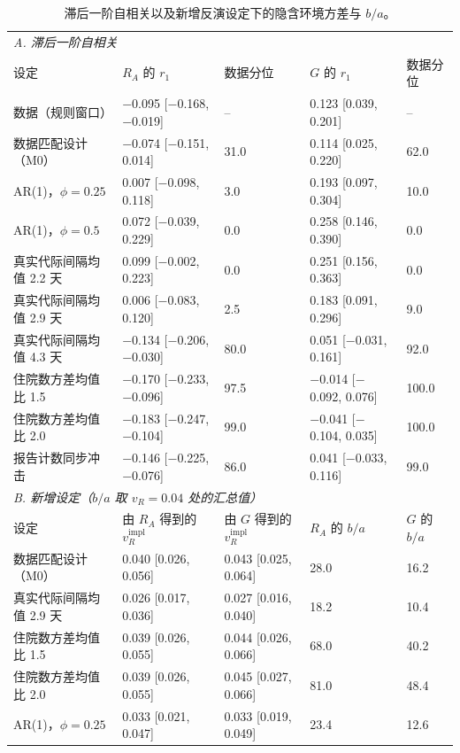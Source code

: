 \begin{table}[htbp]
\centering
\footnotesize
\setlength{\tabcolsep}{4pt}
\caption{滞后一阶自相关以及新增反演设定下的隐含环境方差与 $b/a$。}
\label{tab:s10}
\begin{tabular}{lllll}
\toprule
\multicolumn{5}{l}{\textit{A. 滞后一阶自相关}}\\
设定 & $R_A$ 的 $r_1$ & 数据分位 & $G$ 的 $r_1$ & 数据分位 \\
\midrule
数据（规则窗口） & $-$0.095 [$-$0.168, $-$0.019] & -- & 0.123 [0.039, 0.201] & -- \\
数据匹配设计（M0） & $-$0.074 [$-$0.151, 0.014] & 31.0 & 0.114 [0.025, 0.220] & 62.0 \\
AR(1)，$\phi=0.25$ & 0.007 [$-$0.098, 0.118] & 3.0 & 0.193 [0.097, 0.304] & 10.0 \\
AR(1)，$\phi=0.5$ & 0.072 [$-$0.039, 0.229] & 0.0 & 0.258 [0.146, 0.390] & 0.0 \\
真实代际间隔均值 2.2 天 & 0.099 [$-$0.002, 0.223] & 0.0 & 0.251 [0.156, 0.363] & 0.0 \\
真实代际间隔均值 2.9 天 & 0.006 [$-$0.083, 0.120] & 2.5 & 0.183 [0.091, 0.296] & 9.0 \\
真实代际间隔均值 4.3 天 & $-$0.134 [$-$0.206, $-$0.030] & 80.0 & 0.051 [$-$0.031, 0.161] & 92.0 \\
住院数方差均值比 1.5 & $-$0.170 [$-$0.233, $-$0.096] & 97.5 & $-$0.014 [$-$0.092, 0.076] & 100.0 \\
住院数方差均值比 2.0 & $-$0.183 [$-$0.247, $-$0.104] & 99.0 & $-$0.041 [$-$0.104, 0.035] & 100.0 \\
报告计数同步冲击 & $-$0.146 [$-$0.225, $-$0.076] & 86.0 & 0.041 [$-$0.033, 0.116] & 99.0 \\
\midrule
\multicolumn{5}{l}{\textit{B. 新增设定（$b/a$ 取 $v_R=0.04$ 处的汇总值）}}\\
设定 & 由 $R_A$ 得到的 $v_R^{\mathrm{impl}}$ & 由 $G$ 得到的 $v_R^{\mathrm{impl}}$ & $R_A$ 的 $b/a$ & $G$ 的 $b/a$ \\
\midrule
数据匹配设计（M0） & 0.040 [0.026, 0.056] & 0.043 [0.025, 0.064] & 28.0 & 16.2 \\
真实代际间隔均值 2.9 天 & 0.026 [0.017, 0.036] & 0.027 [0.016, 0.040] & 18.2 & 10.4 \\
住院数方差均值比 1.5 & 0.039 [0.026, 0.055] & 0.044 [0.026, 0.066] & 68.0 & 40.2 \\
住院数方差均值比 2.0 & 0.039 [0.026, 0.055] & 0.045 [0.027, 0.066] & 81.0 & 48.4 \\
AR(1)，$\phi=0.25$ & 0.033 [0.021, 0.047] & 0.033 [0.019, 0.049] & 23.4 & 12.6 \\

\end{tabular}
\end{table}
